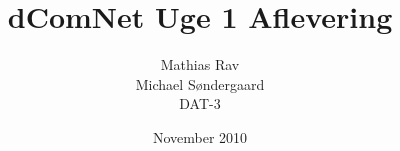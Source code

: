 \documentclass[12pt,a4paper]{article}
\begin{document}
\title{dComNet Uge 1 Aflevering}
\author{Mathias Rav \\
		Michael Søndergaard \\
		DAT-3}
\date{November 2010}
\maketitle
\end{document}
